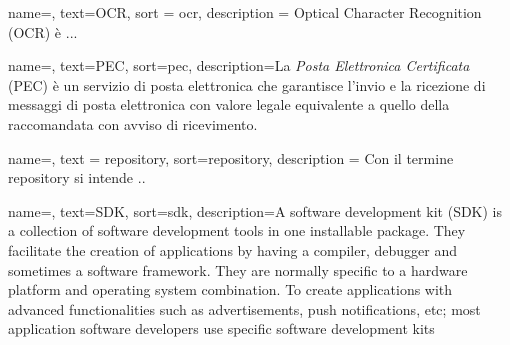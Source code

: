 



 {
    name=,
    text=OCR,
    sort = ocr,
    description = {Optical Character Recognition (OCR) è
    ...}
}

 {
    name=,
    text=PEC,
    sort=pec,
    description={La \emph{Posta Elettronica Certificata} (PEC) è un servizio di posta elettronica che garantisce l'invio e la ricezione di messaggi di posta elettronica con valore legale equivalente a quello della raccomandata con avviso di ricevimento.}
}

 {
    name=,
    text = repository,
    sort=repository,
    description = {Con il termine repository si intende ..
    }
}


 {
    name=,
    text=SDK,
    sort=sdk,
    description={A software development kit (SDK) is a collection of software development tools in one installable package. They facilitate the creation of applications by having a compiler, debugger and sometimes a software framework. They are normally specific to a hardware platform and operating system combination. To create applications with advanced functionalities such as advertisements, push notifications, etc; most application software developers use specific software development kits}
}

